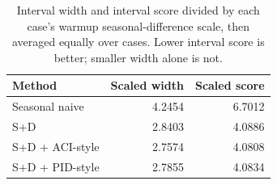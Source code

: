 \begin{table}[htbp]\centering\footnotesize
\caption{Interval width and interval score divided by each case's warmup seasonal-difference scale, then averaged equally over cases. Lower interval score is better; smaller width alone is not.}
\begin{tabular}{lrr}
\toprule
Method & Scaled width & Scaled score\\\midrule
Seasonal naive & 4.2454 & 6.7012\\
S+D & 2.8403 & 4.0886\\
S+D + ACI-style & 2.7574 & 4.0808\\
S+D + PID-style & 2.7855 & 4.0834\\
\bottomrule\end{tabular}\end{table}
